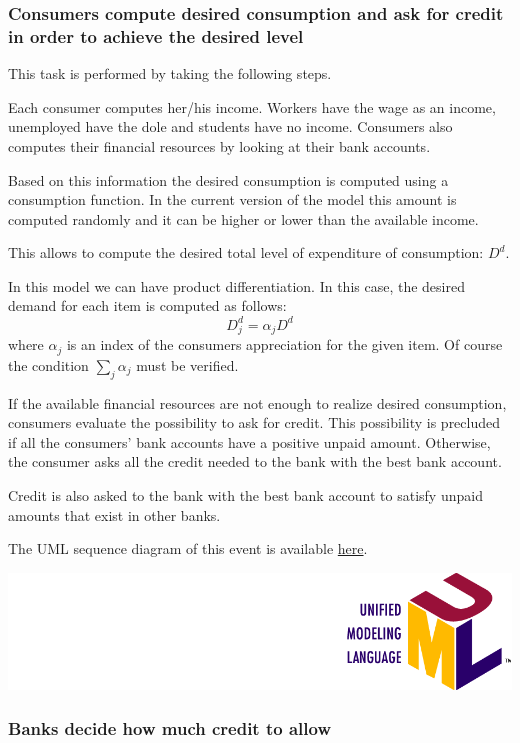 \documentclass{book}
\newcommand{\umllocation}{file:///Users/giulioni/Dropbox/svn/sfcabm_my/documentation}
\begin{document}
\subsubsection{Consumers compute desired consumption and ask for credit in order to achieve the desired level}
This task is performed by taking the following steps.

Each consumer computes her/his income. Workers have the wage as an income, unemployed have the dole and students have no income. Consumers also computes their financial resources by looking at their bank accounts. 

Based on this information the desired consumption is computed using a consumption function. In the current version of the model this amount is computed randomly and it can be higher or lower than the available income.  

This allows to compute the desired total level of expenditure of consumption: $D^d$.

In this model we can have product differentiation. In this case, the desired demand for each item is computed as follows:
\[
D_j^d=\alpha_jD^d
\]
where $\alpha_j$ is an index of the consumers appreciation for the given item. Of course the condition $\sum_j \alpha_j$ must be verified.

If the available financial resources are not enough to realize desired consumption, consumers evaluate the possibility to ask for credit. This possibility is precluded if all the consumers' bank accounts have a positive unpaid amount. Otherwise, the consumer asks all the credit needed to the bank with the best bank account. 

Credit is also asked to the bank with the best bank account to satisfy unpaid amounts that exist in other banks. 


The UML sequence diagram of this event is available \href{\umllocation/stepDesiredConsumption.html}{here}.
\begin{marginfigure}
	\includegraphics[scale=0.1]{uml.png}
\end{marginfigure}

\subsubsection{Banks decide how much credit to allow}
\end{document}
